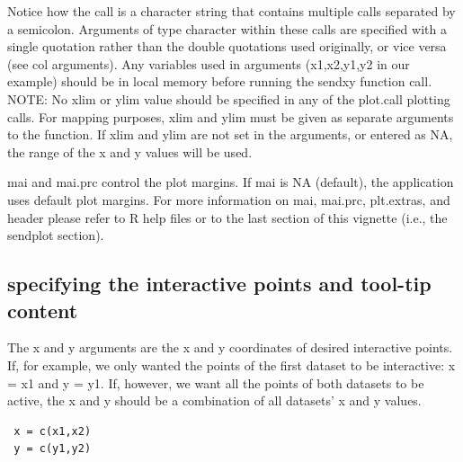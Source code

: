 \documentclass[]{article}
\begin{document}
Notice how the call is a character string that contains multiple calls separated by a semicolon. Arguments of type character within these calls are specified with a single quotation rather than the double quotations used originally, or vice versa (see col arguments). Any variables used in arguments (x1,x2,y1,y2 in our example) should be in local memory before running the sendxy function call. \\ \indent NOTE: No xlim or ylim value should be specified in any of the plot.call plotting calls. For mapping purposes, xlim and ylim must be given as separate arguments to the function. If xlim and ylim are not set in the arguments, or entered as NA, the range of the x and y values will be used. \newline

\indent mai and mai.prc control the plot margins. If mai is NA (default), the application uses default plot margins. For more information on mai, mai.prc, plt.extras, and header please refer to R help files or to the last section of this vignette (i.e., the sendplot section). \newline

\subsection{specifying the interactive points and tool-tip content}

\indent The x and y arguments are the x and y coordinates of desired interactive points. If, for example, we only wanted the points of the first dataset to be interactive: x = x1 and y = y1.  If, however, we want all the points of both datasets to be active, the x and y should be a combination of all datasets' x and y values.  
\begin{verbatim}
 x = c(x1,x2)
 y = c(y1,y2)
\end{verbatim}
\end{document}
